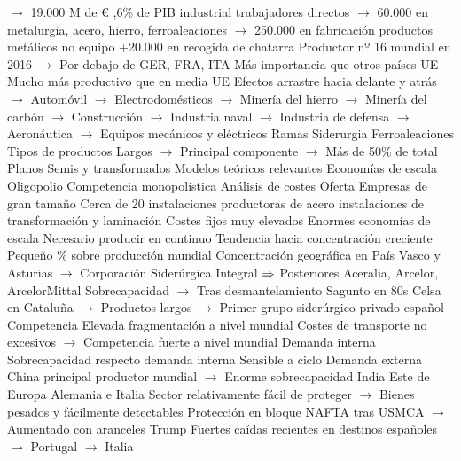 \documentclass{nuevotema}
\begin{document}
\begin{esquemal}
				\4[] $\to$ 19.000 M de €
				,6\% de PIB industrial
				 trabajadores directos
				\4[] $\to$ 60.000 en metalurgia, acero, hierro, ferroaleaciones
				\4[] $\to$ 250.000 en fabricación productos metálicos no equipo
				\4[] +20.000 en recogida de chatarra
				\4[] Productor nº 16 mundial en 2016
				\4[] $\to$ Por debajo de GER, FRA, ITA
				\4[] Más importancia que otros países UE
				\4[] Mucho más productivo que en media UE
				\4[] Efectos arrastre hacia delante y atrás
				\4[] $\to$ Automóvil
				\4[] $\to$ Electrodomésticos
				\4[] $\to$ Minería del hierro
				\4[] $\to$ Minería del carbón
				\4[] $\to$ Construcción
				\4[] $\to$ Industria naval
				\4[] $\to$ Industria de defensa
				\4[] $\to$ Aeronáutica
				\4[] $\to$ Equipos mecánicos y eléctricos
				\4 Ramas
				\4[] Siderurgia
				\4[] Ferroaleaciones
				\4 Tipos de productos
				\4[] Largos
				\4[] $\to$ Principal componente
				\4[] $\to$ Más de 50\% de total
				\4[] Planos
				\4[] Semis y transformados
				\4 Modelos teóricos relevantes
				\4[] Economías de escala
				\4[] Oligopolio
				\4[] Competencia monopolística
				\4[] Análisis de costes
				\4 Oferta
				\4[] Empresas de gran tamaño
				\4[] Cerca de 20 instalaciones productoras de acero
				 instalaciones de transformación y laminación
				\4[] Costes fijos muy elevados
				\4[] Enormes economías de escala
				\4[] Necesario producir en continuo
				\4[] Tendencia hacia concentración creciente
				\4[] Pequeño \% sobre producción mundial
				\4[] Concentración geográfica en País Vasco y Asturias
				\4[] $\to$ Corporación Siderúrgica Integral
				\4[] $\Rightarrow$ Posteriores Aceralia, Arcelor, ArcelorMittal
				\4[] Sobrecapacidad
				\4[] $\to$ Tras desmantelamiento Sagunto en 80s
				\4[] Celsa en Cataluña
				\4[] $\to$ Productos largos
				\4[] $\to$ Primer grupo siderúrgico privado español
				\4 Competencia
				\4[] Elevada fragmentación a nivel mundial
				\4[] Costes de transporte no excesivos
				\4[] $\to$ Competencia fuerte a nivel mundial
				\4 Demanda interna
				\4[] Sobrecapacidad respecto demanda interna
				\4[] Sensible a ciclo
				\4 Demanda externa
				\4[] China principal productor mundial
				\4[] $\to$ Enorme sobrecapacidad
				\4[] India
				\4[] Este de Europa
				\4[] Alemania e Italia
				\4[] Sector relativamente fácil de proteger
				\4[] $\to$ Bienes pesados y fácilmente detectables
				\4[] Protección en bloque NAFTA tras USMCA
				\4[] $\to$ Aumentado con aranceles Trump
				\4[] Fuertes caídas recientes en destinos españoles
				\4[] $\to$ Portugal
				\4[] $\to$ Italia

\end{esquemal}
\end{document}
